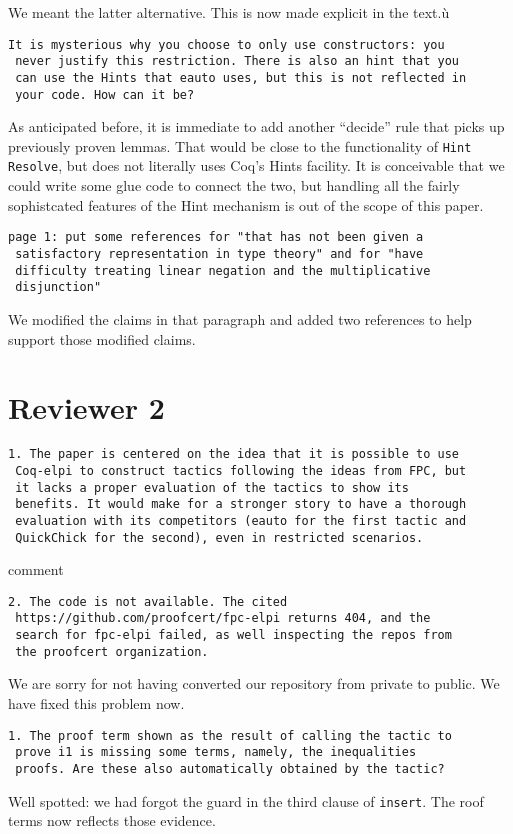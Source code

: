 \documentclass{article}
\begin{document}
We meant the latter alternative. This is now made explicit in the text.ù

\begin{verbatim}
It is mysterious why you choose to only use constructors: you
 never justify this restriction. There is also an hint that you
 can use the Hints that eauto uses, but this is not reflected in
 your code. How can it be?
\end{verbatim}
As anticipated before, it is immediate to add another ``decide'' rule
that picks up previously proven lemmas. That would be close to the
functionality of \texttt{Hint Resolve}, but does not literally uses
Coq's Hints facility. It is conceivable that we could write some glue
code to connect the two, but handling all the fairly sophistcated features of the Hint
mechanism is out of the scope of this paper.

\begin{verbatim}
page 1: put some references for "that has not been given a
 satisfactory representation in type theory" and for "have
 difficulty treating linear negation and the multiplicative
 disjunction"
\end{verbatim}

We modified the claims in that paragraph and added two references
to help support those modified claims.

\section*{Reviewer 2}

\begin{verbatim}
1. The paper is centered on the idea that it is possible to use
 Coq-elpi to construct tactics following the ideas from FPC, but
 it lacks a proper evaluation of the tactics to show its
 benefits. It would make for a stronger story to have a thorough
 evaluation with its competitors (eauto for the first tactic and
 QuickChick for the second), even in restricted scenarios.
\end{verbatim}
comment

\begin{verbatim}
2. The code is not available. The cited
 https://github.com/proofcert/fpc-elpi returns 404, and the
 search for fpc-elpi failed, as well inspecting the repos from
 the proofcert organization.
\end{verbatim}

We are sorry for not having converted our repository from private
to public.  We have fixed this problem now.

\begin{verbatim}
1. The proof term shown as the result of calling the tactic to
 prove i1 is missing some terms, namely, the inequalities
 proofs. Are these also automatically obtained by the tactic?
\end{verbatim}

Well spotted: we had forgot the guard in the third clause of \texttt{insert}. The roof terms now reflects those evidence.
\end{document}
